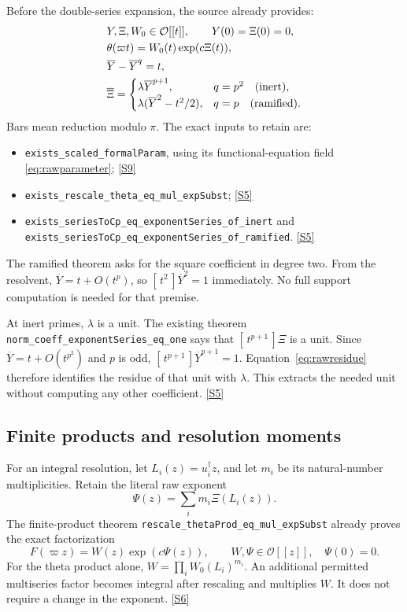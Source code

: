 \documentclass[11pt,letterpaper]{article}
\theoremstyle{remark}
\newcommand{\OO}{\mathcal O}
\newcommand{\coef}[2]{[\, #1\,]#2}
\newcommand{\code}[1]{{\small\nolinkurl{#1}}}
\newcommand{\src}[1]{\hyperref[src:#1]{[S#1]}}
\begin{document}
Before the double-series expansion, the source already provides:
\begin{align}
 &Y,\Xi,W_0\in\OO[[t]],\qquad Y(0)=\Xi(0)=0,\notag\\
 &\theta(\varpi t)=W_0(t)\exp(c\Xi(t)),\label{eq:rawcurve}\\
 &\overline Y-\overline Y^{q}=t,\label{eq:rawparameter}\\
 &\overline\Xi=
 \begin{cases}
   \lambda\overline Y^{p+1},&q=p^2\quad\text{(inert)},\\
   \lambda(\overline Y^2-t^2/2),&q=p\quad\text{(ramified)}.
 \end{cases} \label{eq:rawresidue}
\end{align}
Bars mean reduction modulo \(\pi\). The exact inputs to retain are:
\begin{itemize}
\item \code{exists_scaled_formalParam}, using its functional-equation field
\eqref{eq:rawparameter}; \src{9}
\item \code{exists_rescale_theta_eq_mul_expSubst}; \src{5}
\item \code{exists_seriesToCp_eq_exponentSeries_of_inert} and
\code{exists_seriesToCp_eq_exponentSeries_of_ramified}. \src{5}
\end{itemize}
The ramified theorem asks for the square coefficient in degree two. From the
resolvent, \(\overline Y=t+O(t^p)\), so
\(\coef{t^2}{\overline Y^2}=1\) immediately. No full support computation is
needed for that premise.

At inert primes, \(\lambda\) is a unit. The existing theorem
\code{norm_coeff_exponentSeries_eq_one} says that
\(\coef{t^{p+1}}{\Xi}\) is a unit. Since
\(\overline Y=t+O(t^{p^2})\) and \(p\) is odd,
\(\coef{t^{p+1}}{\overline Y^{p+1}}=1\). Equation~\eqref{eq:rawresidue}
therefore identifies the residue of that unit with \(\lambda\).
This extracts the needed unit without computing any other coefficient. \src{5}

\subsection{Finite products and resolution moments}

For an integral resolution, let \(L_i(z)=u_i^\dagger z\), and let \(m_i\) be
its natural-number multiplicities. Retain the literal raw exponent
\begin{equation}
 \Psi(z)=\sum_i m_i\Xi(L_i(z)). \label{eq:rawproduct}
\end{equation}
The finite-product theorem
\code{rescale_thetaProd_eq_mul_expSubst} already proves the exact factorization
\begin{equation}
 F(\varpi z)=W(z)\exp(c\Psi(z)),\qquad
 W,\Psi\in\OO[[z]],\quad\Psi(0)=0. \label{eq:rawfactor}
\end{equation}
For the theta product alone,
\(W=\prod_i W_0(L_i)^{m_i}\). An additional permitted multiseries factor
becomes integral after rescaling and multiplies \(W\). It does not require a
change in the exponent. \src{6}
\end{document}
